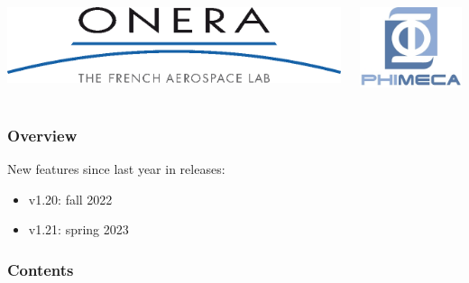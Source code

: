 \documentclass[aspectratio=169]{beamer}
\begin{document}
\begin{frame}
\begin{columns}
  \begin{center}
\includegraphics[height=0.05\textheight]{figures/onera-logo.png}
\end{center}

  \begin{center}
\includegraphics[height=0.08\textheight]{figures/logo-phimeca.png}
\end{center}


  \end{columns}

  \end{frame}

\begin{frame}
\frametitle{Overview}

New features since last year in releases:

\begin{itemize}
\item v1.20: fall 2022
\item v1.21: spring 2023
\end{itemize}

\end{frame}
  

\begin{frame}
\frametitle{Contents}
\tableofcontents
\end{frame}

\end{document}

